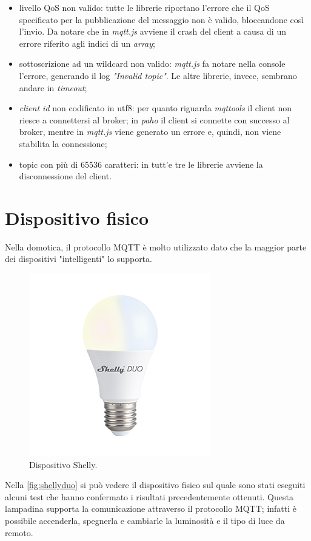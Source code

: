 \documentclass[binding=0.6cm,TFA]{sapthesis}
\begin{document}
\begin{large}
\begin{itemize}
\item livello QoS non valido: tutte le librerie riportano l'errore che il QoS specificato per la pubblicazione del messaggio non è valido, bloccandone così l'invio. Da notare che in \textit{mqtt.js} avviene il crash del client a causa di un errore riferito agli indici di un \textit{array};
\item sottoscrizione ad un wildcard non valido: \textit{mqtt.js} fa notare nella console l'errore, generando il log \textit{"Invalid topic"}. Le altre librerie, invece, sembrano andare in \textit{timeout};
\item \textit{client id} non codificato in utf8: per quanto riguarda \textit{mqttools} il client non riesce a connettersi al broker; in \textit{paho} il client si connette con successo al broker, mentre in \textit{mqtt.js} viene generato un errore e, quindi, non viene stabilita la connessione;
\item topic con più di 65536 caratteri: in tutt'e tre le librerie avviene la disconnessione del client.
\end{itemize}


\section{Dispositivo fisico}
Nella domotica, il protocollo MQTT è molto utilizzato dato che la maggior parte dei dispositivi "intelligenti" lo supporta. 
\begin{figure}[h]
\centering
\includegraphics[scale=0.8]{images/shelly-smart.jpg}
\caption{Dispositivo Shelly.}
\label{fig:shellyduo}
\end{figure}

Nella \autoref{fig:shellyduo} si può vedere il dispositivo fisico sul quale sono stati eseguiti alcuni test che hanno confermato i risultati precedentemente ottenuti. Questa lampadina supporta la comunicazione attraverso il protocollo MQTT; infatti è possibile accenderla, spegnerla e cambiarle la luminosità e il tipo di luce da remoto. \\


\end{large}
\end{document}
